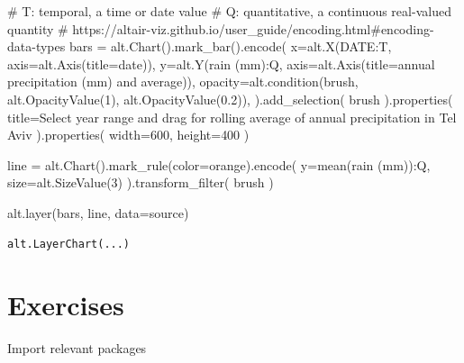\documentclass[
  letterpaper,
  DIV=11,
  numbers=noendperiod]{scrreprt}
\newenvironment{Shaded}{\begin{snugshade}}{\end{snugshade}}
\newcommand{\CommentTok}[1]{\textcolor[rgb]{0.37,0.37,0.37}{#1}}
\newcommand{\DecValTok}[1]{\textcolor[rgb]{0.68,0.00,0.00}{#1}}
\newcommand{\FloatTok}[1]{\textcolor[rgb]{0.68,0.00,0.00}{#1}}
\newcommand{\NormalTok}[1]{\textcolor[rgb]{0.00,0.23,0.31}{#1}}
\newcommand{\OperatorTok}[1]{\textcolor[rgb]{0.37,0.37,0.37}{#1}}
\newcommand{\StringTok}[1]{\textcolor[rgb]{0.13,0.47,0.30}{#1}}
\begin{document}
\begin{Shaded}
\begin{Highlighting}[]
\CommentTok{\# T: temporal, a time or date value}
\CommentTok{\# Q: quantitative, a continuous real{-}valued quantity}
\CommentTok{\# https://altair{-}viz.github.io/user\_guide/encoding.html\#encoding{-}data{-}types}
\NormalTok{bars }\OperatorTok{=}\NormalTok{ alt.Chart().mark\_bar().encode(}
\NormalTok{    x}\OperatorTok{=}\NormalTok{alt.X(}\StringTok{\textquotesingle{}DATE:T\textquotesingle{}}\NormalTok{, axis}\OperatorTok{=}\NormalTok{alt.Axis(title}\OperatorTok{=}\StringTok{\textquotesingle{}date\textquotesingle{}}\NormalTok{)),}
\NormalTok{    y}\OperatorTok{=}\NormalTok{alt.Y(}\StringTok{\textquotesingle{}rain (mm):Q\textquotesingle{}}\NormalTok{,  axis}\OperatorTok{=}\NormalTok{alt.Axis(title}\OperatorTok{=}\StringTok{\textquotesingle{}annual precipitation (mm) and average\textquotesingle{}}\NormalTok{)),}
\NormalTok{    opacity}\OperatorTok{=}\NormalTok{alt.condition(brush, alt.OpacityValue(}\DecValTok{1}\NormalTok{), alt.OpacityValue(}\FloatTok{0.2}\NormalTok{)),}
\NormalTok{).add\_selection(}
\NormalTok{    brush}
\NormalTok{).properties(}
\NormalTok{    title}\OperatorTok{=}\StringTok{\textquotesingle{}Select year range and drag for rolling average of annual precipitation in Tel Aviv\textquotesingle{}}
\NormalTok{).properties(}
\NormalTok{    width}\OperatorTok{=}\DecValTok{600}\NormalTok{,}
\NormalTok{    height}\OperatorTok{=}\DecValTok{400}
\NormalTok{)}

\NormalTok{line }\OperatorTok{=}\NormalTok{ alt.Chart().mark\_rule(color}\OperatorTok{=}\StringTok{\textquotesingle{}orange\textquotesingle{}}\NormalTok{).encode(}
\NormalTok{    y}\OperatorTok{=}\StringTok{\textquotesingle{}mean(rain (mm)):Q\textquotesingle{}}\NormalTok{,}
\NormalTok{    size}\OperatorTok{=}\NormalTok{alt.SizeValue(}\DecValTok{3}\NormalTok{)}
\NormalTok{).transform\_filter(}
\NormalTok{    brush}
\NormalTok{)}

\NormalTok{alt.layer(bars, line, data}\OperatorTok{=}\NormalTok{source)}
\end{Highlighting}
\end{Shaded}

\begin{verbatim}
alt.LayerChart(...)
\end{verbatim}

\hypertarget{exercises-1}{%
\chapter{Exercises}\label{exercises-1}}

Import relevant packages
\end{document}
